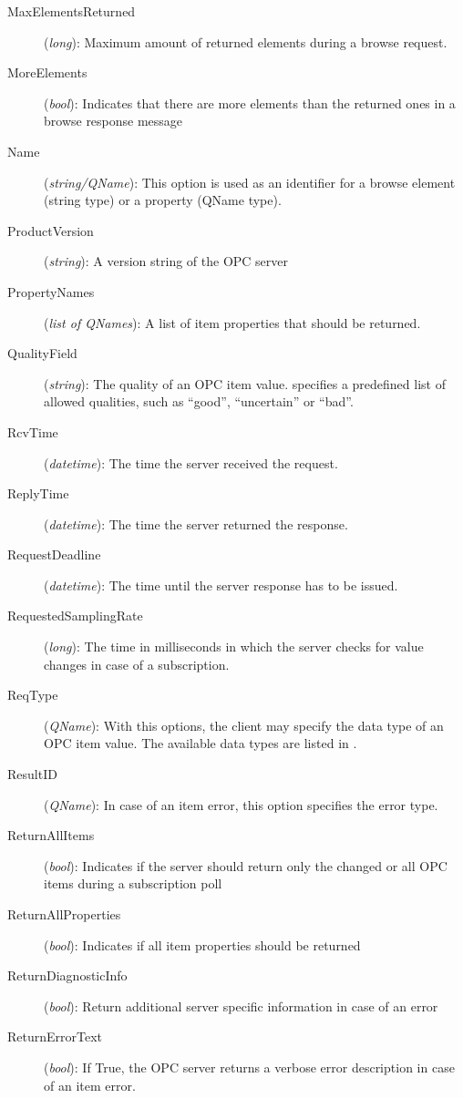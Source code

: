 \begin{description}
\newpage

\item[MaxElementsReturned] ({\sl long}): Maximum amount of returned
elements during a browse request.
\item[MoreElements] ({\sl bool}): Indicates that there are more
elements than the returned ones in a browse response message
\item[Name] ({\sl string/QName}): This option is used as an identifier
for a browse element (string type) or a property (QName type).
\item[ProductVersion] ({\sl string}): A version string of the OPC server
\item[PropertyNames] ({\sl list of QNames}): A list of item properties
that should be returned.
\item[QualityField] ({\sl string}): The quality of an OPC item value.
\cite{OPCXMLDA} specifies a predefined list of allowed qualities, such
as ``good'', ``uncertain'' or ``bad''.
\item[RcvTime] ({\sl datetime}): The time the server received the request.
\item[ReplyTime] ({\sl datetime}): The time the server returned the response.
\item[RequestDeadline] ({\sl datetime}): The time until the server
response has to be issued.
\item[RequestedSamplingRate] ({\sl long}): The time in milliseconds in
which the server checks for value changes in case of a subscription.
\item[ReqType] ({\sl QName}): With this options, the client may
specify the data type of an OPC item value. The available data types
are listed in \cite{OPCXMLDA}.
\item[ResultID] ({\sl QName}): In case of an item error, this option
specifies the error type.
\item[ReturnAllItems] ({\sl bool}): Indicates if the server should
return only the changed or all OPC items during a subscription poll
\item[ReturnAllProperties] ({\sl bool}): Indicates if all item
properties should be returned
\item[ReturnDiagnosticInfo] ({\sl bool}): Return additional server
specific information in case of an error
\item[ReturnErrorText] ({\sl bool}): If True, the OPC server returns a
verbose error description in case of an item error.

\end{description}
